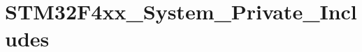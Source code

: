 \hypertarget{group___s_t_m32_f4xx___system___private___includes}{\section{S\-T\-M32\-F4xx\-\_\-\-System\-\_\-\-Private\-\_\-\-Includes}
\label{group___s_t_m32_f4xx___system___private___includes}
}
